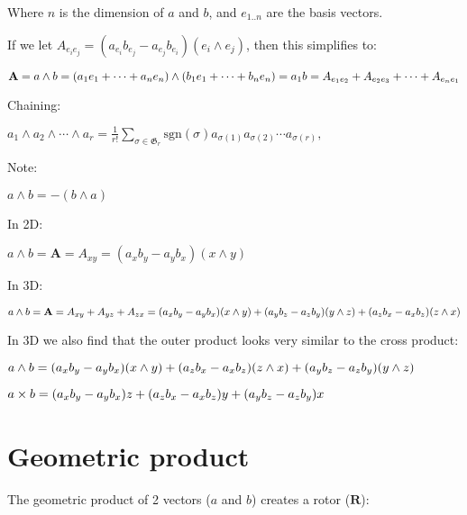 \documentclass[14pt]{extarticle}
\begin{document}
Where \(n\) is the dimension of \(a\) and \(b\),
and \(e_{1..n}\) are the basis vectors.

If we let
\( A_{e_i e_j} = (a_{e_i} b_{e_j} - a_{e_j} b_{e_i})(e_i \wedge e_j) \),
then this simplifies to:

\(
  \mathbf{A}
  = a \wedge b \\
  = (a_1 e_1 + \cdots + a_n e_n) \wedge (b_1 e_1 + \cdots + b_n e_n) \\
  = a_1 b \\
  = A_{e_1 e_2} + A_{e_2 e_3} + \cdots + A_{e_n e_1}
\)

Chaining:

\(
  a_1 \wedge a_2 \wedge \cdots \wedge a_r
  = \frac{1}{r!} \sum\limits_{\sigma \in \mathfrak{G}_r}
  \textrm{sgn} (\sigma) a_{\sigma (1)} a_{\sigma (2)} \cdots a_{\sigma (r)} ,
\)

Note:

\( a \wedge b = - (b \wedge a) \)

In 2D:

\(
  a \wedge b
  = \mathbf{A}
  = A_{xy}
  = (a_x b_y - a_y b _x) (x \wedge y)
\)

In 3D:

\(
  a \wedge b
  = \mathbf{A}
  = A_{xy} + A_{yz} + A_{zx} \\
  = (a_x b_y - a_y b_x) (x \wedge y)
  + (a_y b_z - a_z b_y) (y \wedge z)
  + (a_z b_x - a_x b_z) (z \wedge x)
\)

\pagebreak
In 3D we also find that the outer product looks very similar to
the cross product:

\(
  a \wedge b = \\
  (a_x b_y - a_y b_x) (x \wedge y) + \\
  (a_z b_x - a_x b_z) (z \wedge x) + \\
  (a_y b_z - a_z b_y) (y \wedge z)
\)

\(
  a \times b = \\
  (a_x b_y - a_y b_x) z + \\
  (a_z b_x - a_x b_z) y + \\
  (a_y b_z - a_z b_y) x
\)

%
%

\pagebreak
\section{Geometric product}
\label{sec:geometric-product}

The geometric product of 2 vectors (\(a\) and \(b\))
creates a rotor (\(\mathbf{R}\)):
\end{document}
